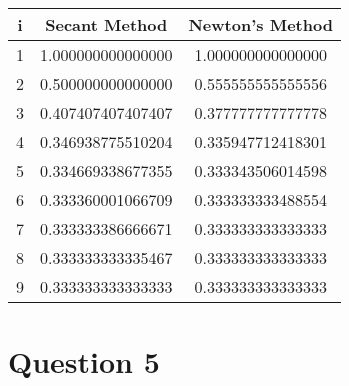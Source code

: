 \documentclass{article}
\begin{document}
\begin{center}
    \begin{tabular}{||c c c||}
    \hline
    \textbf{i} & \textbf{Secant Method} & \textbf{Newton's Method}\\ [0.5ex]
    \hline\hline
    1 & 1.000000000000000 & 1.000000000000000  \\ [1ex]
    \hline
    2 & 0.500000000000000 & 0.555555555555556 \\ [1ex]
    \hline
    3 & 0.407407407407407 & 0.377777777777778 \\ [1ex]
    \hline
    4 & 0.346938775510204 & 0.335947712418301 \\ [1ex]
    \hline
    5 & 0.334669338677355 & 0.333343506014598 \\ [1ex]
    \hline
    6 & 0.333360001066709 & 0.333333333488554 \\ [1ex]
    \hline
    7 & 0.333333386666671 & 0.333333333333333 \\ [1ex]
    \hline
    8 & 0.333333333335467 & 0.333333333333333 \\ [1ex]
    \hline
    9 & 0.333333333333333 & 0.333333333333333 \\ [1ex]
    \hline
    \end{tabular}
\end{center}


\section*{Question 5}
\end{document}
